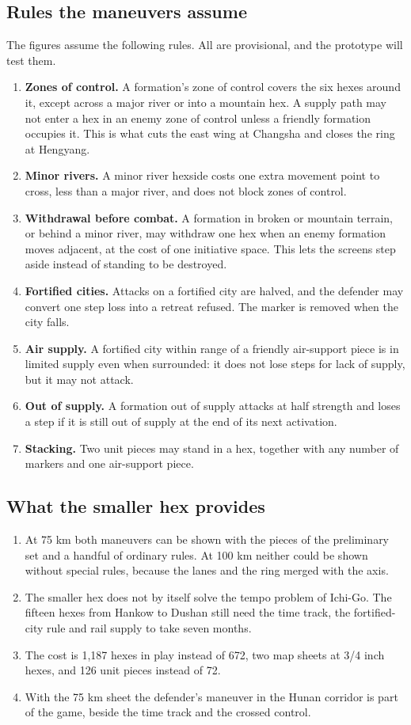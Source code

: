 \subsection{Rules the maneuvers assume}\label{sub:mrules}
The figures assume the following rules. All are provisional, and the prototype will test them.
\begin{enumerate}
\item \textbf{Zones of control.} A formation's zone of control covers the six hexes around it, except across a major river or into a mountain hex. A supply path may not enter a hex in an enemy zone of control unless a friendly formation occupies it. This is what cuts the east wing at Changsha and closes the ring at Hengyang.
\item \textbf{Minor rivers.} A minor river hexside costs one extra movement point to cross, less than a major river, and does not block zones of control.
\item \textbf{Withdrawal before combat.} A formation in broken or mountain terrain, or behind a minor river, may withdraw one hex when an enemy formation moves adjacent, at the cost of one initiative space. This lets the screens step aside instead of standing to be destroyed.
\item \textbf{Fortified cities.} Attacks on a fortified city are halved, and the defender may convert one step loss into a retreat refused. The marker is removed when the city falls.
\item \textbf{Air supply.} A fortified city within range of a friendly air-support piece is in limited supply even when surrounded: it does not lose steps for lack of supply, but it may not attack.
\item \textbf{Out of supply.} A formation out of supply attacks at half strength and loses a step if it is still out of supply at the end of its next activation.
\item \textbf{Stacking.} Two unit pieces may stand in a hex, together with any number of markers and one air-support piece.
\end{enumerate}

\subsection{What the smaller hex provides}
\begin{enumerate}
\item At 75 km both maneuvers can be shown with the pieces of the preliminary set and a handful of ordinary rules. At 100 km neither could be shown without special rules, because the lanes and the ring merged with the axis.
\item The smaller hex does not by itself solve the tempo problem of Ichi-Go. The fifteen hexes from Hankow to Dushan still need the time track, the fortified-city rule and rail supply to take seven months.
\item The cost is 1,187 hexes in play instead of 672, two map sheets at 3/4 inch hexes, and 126 unit pieces instead of 72.
\item With the 75 km sheet the defender's maneuver in the Hunan corridor is part of the game, beside the time track and the crossed control.
\end{enumerate}
